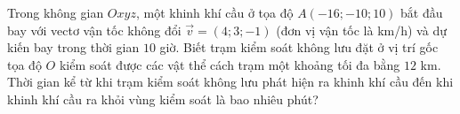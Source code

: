 \begin{ex}
Trong không gian $Oxyz$, một khinh khí cầu ở tọa độ $A(-16;-10;10)$ bắt đầu bay với vectơ vận tốc không đổi $\vec v=(4;3;-1)$ (đơn vị vận tốc là km/h) và dự kiến bay trong thời gian $10$ giờ. Biết trạm kiểm soát không lưu đặt ở vị trí gốc tọa độ $O$ kiểm soát được các vật thể cách trạm một khoảng tối đa bằng $12$ km. Thời gian kể từ khi trạm kiểm soát không lưu phát hiện ra khinh khí cầu đến khi khinh khí cầu ra khỏi vùng kiểm soát là bao nhiêu phút?
\end{ex}
